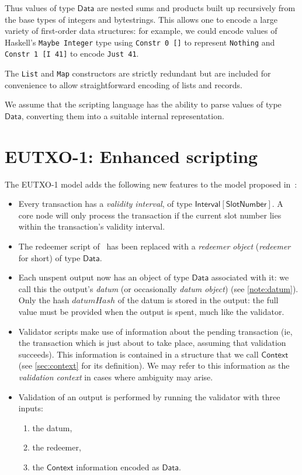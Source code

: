 \documentclass[a4paper]{article}
\newcounter{note}
\newcommand{\s}{\textsf}  %
\newcommand{\mi}[1]{\ensuremath{\mathit{#1}}}
\newcommand{\Interval}[1]{\ensuremath{\s{Interval}[#1]}}
\newcommand{\ctx}{\ensuremath{\s{Context}}}
\newcommand{\datumHash}{\mi{datumHash}}
\newcommand{\Data}{\ensuremath{\s{Data}}}
\newcommand{\slotnum}{\ensuremath{\s{SlotNumber}}}
\begin{document}
\noindent Thus values of type \Data{} are nested sums and products
built up recursively from the base types of integers and
bytestrings. This allows one to encode a large variety of first-order
data structures: for example, we could encode values of Haskell's
\verb|Maybe Integer| type using \verb|Constr 0 []| to represent
\verb|Nothing| and \verb|Constr 1 [I 41]| to encode \verb|Just 41|.


The \texttt{List} and \texttt{Map} constructors are strictly
redundant but are included for convenience to allow straightforward
encoding of lists and records.

We assume that the scripting language has the ability to parse values
of type \Data{}, converting them into a suitable internal representation.

\section{EUTXO-1: Enhanced scripting}
\label{sec:eutxo-1}
The EUTXO-1 model adds the following new features to the model
proposed in~\citep{Zahnentferner18-UTxO}:

\begin{itemize}
\item Every transaction has a \textit{validity interval}, of type $\Interval{\slotnum}$.
  A core node will only process the transaction if
  the current slot number lies within the transaction's validity
  interval.

\item The redeemer script of~\citet{Zahnentferner18-UTxO} has been
  replaced with a \textit{redeemer object} (\textit{redeemer} for short) of
  type \Data{}.

\item Each unspent output now has an object of type \Data{} associated
  with it: we call this the output's \textit{datum} (or occasionally
  \emph{datum object}) (see \cref{note:datum}).  Only the hash
  $\datumHash$ of the datum is stored in the output: the full value
  must be provided when the output is spent, much like the validator.

\item Validator scripts make use of information about the pending
  transaction (ie, the transaction which is just about to take place,
  assuming that validation succeeds). This information is contained in
  a structure that we call \ctx{} (see \cref{sec:context} for its
  definition).  We may refer to this information as the
  \textit{validation context} in cases where ambiguity may arise.

\item Validation of an output is performed by running the validator
  with three inputs:
  \begin{enumerate}
  \item the datum,
  \item the redeemer,
  \item the \ctx{} information encoded as \Data{}.
  \end{enumerate}

\end{itemize}
\end{document}
